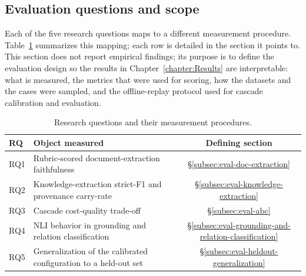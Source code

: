 \subsection{Evaluation questions and scope}\label{subsec:eval-questions-and-scope}

Each of the five research questions maps to a different measurement procedure. Table~\ref{tab:research-questions} summarizes this mapping; each row is detailed in the section it points to. This section does not report empirical findings; its purpose is to define the evaluation design so the results in Chapter~\ref{chapter:Results} are interpretable: what is measured, the metrics that were used for scoring, how the datasets and the cases were sampled, and the offline-replay protocol used for cascade calibration and evaluation. 

\begin{table}[h]
\centering
    \begin{tabular}{@{}llc@{}}
        \toprule
        \textbf{RQ} & \textbf{Object measured} & \textbf{Defining section} \\
        \midrule
        RQ1 & Rubric-scored document-extraction faithfulness
        & §\ref{subsec:eval-doc-extraction} \\
        RQ2 & Knowledge-extraction strict-F1 and provenance carry-rate
        & §\ref{subsec:eval-knowledge-extraction} \\
        RQ3 & Cascade cost-quality trade-off
        & §\ref{subsec:eval-abc} \\
        RQ4 & NLI behavior in grounding and relation classification
        & §\ref{subsec:eval-grounding-and-relation-classification} \\
        RQ5 & Generalization of the calibrated configuration to a held-out set & §\ref{subsec:eval-heldout-generalization} \\
        \bottomrule
    \end{tabular}
    \caption{Research questions and their measurement procedures.}
    \label{tab:research-questions}
\end{table}